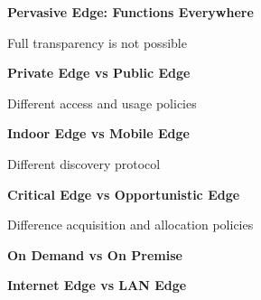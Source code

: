 \textbf{Pervasive Edge: Functions Everywhere}

Full transparency is not possible

\textbf{Private Edge vs Public Edge}

Different access and usage policies

\textbf{Indoor Edge vs Mobile Edge}

Different discovery protocol

\textbf{Critical Edge vs Opportunistic Edge}

Difference acquisition and allocation policies


\textbf{On Demand vs On Premise}

\textbf{Internet Edge vs LAN Edge}